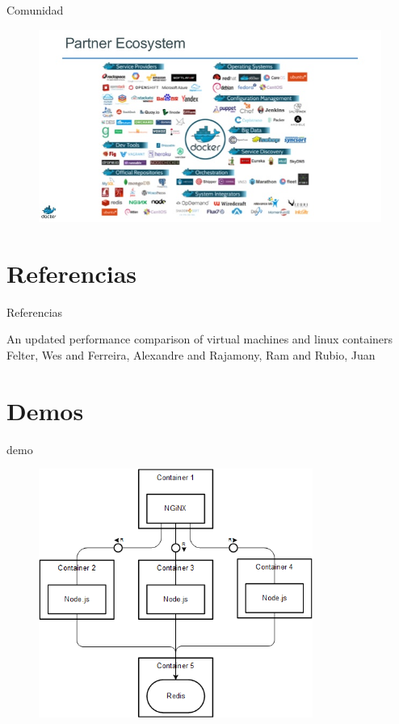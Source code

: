 \documentclass[compress]{beamer}
\begin{document}
\begin{frame}{Comunidad}
\begin{figure}[H]
  \centering
  \includegraphics[width=1\textwidth]{images/ecosystem.jpg}
    \label{fig:dynamic}
\end{figure}		
\end{frame}
	
\section*{Referencias}
\begin{frame}{Referencias}
	\begin{thebibliography}{10}
    
	\beamertemplatebookbibitems
	An updated performance comparison of virtual machines and linux containers
	\newblock Felter, Wes and Ferreira, Alexandre and Rajamony, Ram and Rubio, Juan
  \end{thebibliography}
\end{frame}

\maketitle

\section{Demos}
\begin{frame}{demo}
\begin{figure}[H]
  \centering
  \includegraphics[width=0.8\textwidth]{images/DockerSample.png}
    \label{fig:dynamic}
\end{figure}	
\end{frame}
\end{document}
